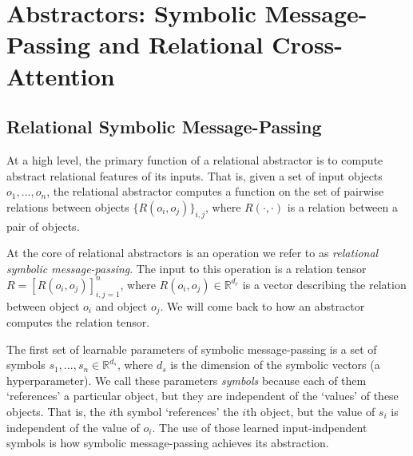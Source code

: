 
\usepackage{amsmath, amssymb}
\usepackage{cleveref}
\usepackage{algorithm2e}

\newcommand{\MLP}{\text{MLP}}
\newcommand{\FeedForward}{\text{FeedForward}}
\newcommand{\Softmax}{\text{Softmax}}
\newcommand{\reals}{\mathbb{R}}



% 


\addtocounter{section}{1}
\section{Abstractors: Symbolic Message-Passing and Relational Cross-Attention}

\subsection{Relational Symbolic Message-Passing}
At a high level, the primary function of a relational abstractor is to compute abstract relational features of its inputs. That is, given a set of input objects $o_1, ..., o_n$, the relational abstractor computes a function on the set of pairwise relations between objects $\{ R(o_i, o_j) \}_{i,j}$, where $R(\cdot, \cdot)$ is a relation between a pair of objects.

At the core of relational abstractors is an operation we refer to as \textit{relational symbolic message-passing}. The input to this operation is a relation tensor $R = \left[R(o_i, o_j)\right]_{i,j=1}^n$, where $R(o_i, o_j) \in \mathbb{R}^{d_r}$ is a vector describing the relation between object $o_i$ and object $o_j$. We will come back to how an abstractor computes the relation tensor.

The first set of learnable parameters of symbolic message-passing is a set of symbols $s_1, ..., s_n \in \mathbb{R}^{d_s}$, where $d_s$ is the dimension of the symbolic vectors (a hyperparameter). We call these parameters \textit{symbols} because each of them `references' a particular object, but they are independent of the `values' of these objects. That is, the $i$th symbol `references' the $i$th object, but the value of $s_i$ is independent of the value of $o_i$. The use of those learned input-indpendent symbols is how symbolic message-passing achieves its abstraction.

